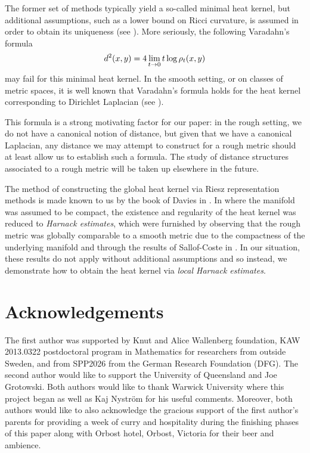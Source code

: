 \documentclass[a4paper, 12pt]{amsart}
\begin{document}
The former set of methods typically yield a so-called minimal heat kernel,
but additional assumptions, such as a lower bound on Ricci curvature,
is assumed in order to obtain its uniqueness (see \cite{Chavel}).
More seriously, the following Varadahn's formula
$$ d^2(x,y) = 4 \lim_{t \to 0} t \log \rho_t(x,y)$$
may fail for this minimal heat kernel. In the smooth setting, or on classes of
metric spaces, it is well known that Varadahn's formula holds for the heat 
kernel corresponding to Dirichlet Laplacian 
(see  \cite{Berger, ERS}).

This formula is a strong motivating factor for our paper: 
in the rough setting, we do not have a canonical notion of
distance, but given that we have a canonical Laplacian, 
any distance we may attempt to construct for a rough 
metric should at least allow us to establish such a formula.  
The study of distance structures associated to a rough metric 
will be taken up elsewhere in the future.

The method of constructing the global heat kernel
via Riesz representation methods is made known to us by
the book of Davies in \cite{Davies}.
In \cite{BCont} where the manifold was assumed to be compact, 
the existence and regularity of the heat kernel was
reduced to \emph{Harnack estimates}, which were
furnished by observing that  
the rough metric was globally comparable to a smooth metric
due to the compactness of the underlying manifold and
through the  results of Sallof-Coste in \cite{SC}.
In our situation, these results do not apply without additional assumptions
and so instead, we demonstrate
how to obtain the heat kernel via \emph{local Harnack estimates}. 

\section*{Acknowledgements}

The first author was supported by Knut and Alice Wallenberg foundation, KAW 2013.0322 
postdoctoral program in Mathematics for researchers from outside Sweden, and from SPP2026 
from the German Research Foundation (DFG).
The second author would like to support the University of Queensland and Joe Grotowski.
Both authors would like to thank Warwick University where this project began as
well as Kaj Nyström for his useful comments.
Moreover, both authors would like to also acknowledge the gracious support of the first author's 
parents for providing a week of curry and hospitality during the finishing phases
of this paper along with Orbost hotel, Orbost, Victoria for their beer and ambience. 
\end{document}
